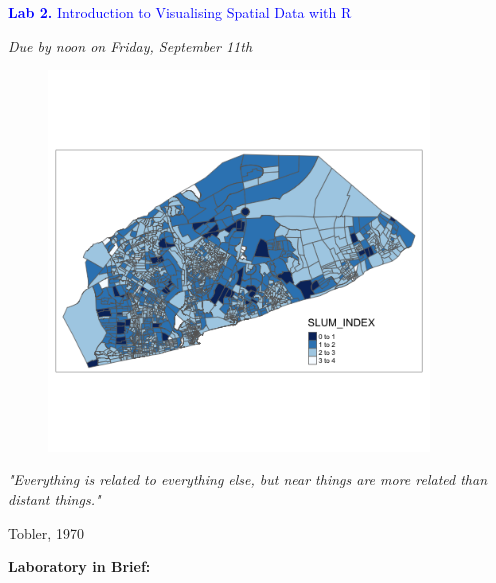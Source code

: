 \documentclass{article}
\begin{document}
\vspace*{.01mm}

\begin{center}

\Large{\textcolor{blue}{\textbf{Lab 2.}  Introduction to Visualising Spatial Data with R}}

\vspace{4mm}

\textit{Due by noon on Friday, September 11th}\\

\end{center}

\begin{figure}[h!]
\begin{center}
\includegraphics[width=0.9\textwidth]{accra.png}

\end{center}
\end{figure}

\setlength{\parindent}{0cm}

\large{\textit{"Everything is related to everything else, but near things are more related than distant things."}
\begin{flushright}
Tobler, 1970
\end{flushright}
}


\newpage


\large{\textbf{Laboratory in Brief:}}
\end{document}
